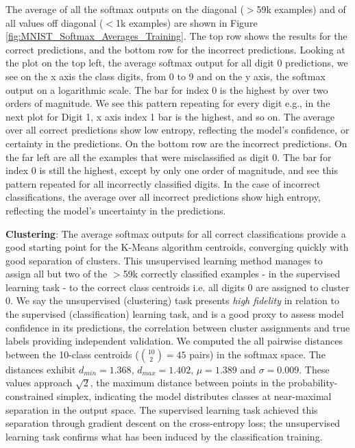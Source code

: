 The average of all the softmax outputs on the diagonal ($>$59k examples) and of all values off diagonal ($<$1k examples) are shown in Figure \ref{fig:MNIST_Softmax_Averages_Training}. The top row shows the results for the correct predictions, and the bottom row for the incorrect predictions. Looking at the plot on the top left, the average softmax output for all digit 0 predictions, we see on the x axis the class digits, from 0 to 9 and on the y axis, the softmax output on a logarithmic scale. The bar for index 0 is the highest by over two orders of magnitude. We see this pattern repeating for every digit e.g., in the next plot for Digit 1, x axis index 1 bar is the highest, and so on. The average over all correct predictions show low entropy, reflecting the model's confidence, or certainty in the predictions. On the bottom row are the incorrect predictions. On the far left are all the examples that were misclassified as digit 0. The bar for index 0 is still the highest, except by only one order of magnitude, and see this pattern repeated for all incorrectly classified digits. In the case of incorrect classifications, the average over all incorrect predictions show high entropy, reflecting the model's uncertainty in the predictions.

\noindent  \textbf{Clustering}: The average softmax outputs for all correct classifications provide a good starting point for the K-Means algorithm centroids, converging quickly with good separation of clusters. This unsupervised learning method manages to assign all but two of the $>$59k correctly classified examples - in the supervised learning task - to the correct class centroids i.e. all digits 0 are assigned to cluster 0. We say the unsupervised (clustering) task presents \emph{high fidelity} in relation to the supervised (classification) learning task, and is a good proxy to assess model confidence in its predictions, the correlation between cluster assignments and true labels providing independent validation. 
We computed the all pairwise distances between the 10-class centroids ($\binom{10}{2}=45$ pairs) in the softmax space. The distances exhibit $d_{min}=1.368$, $d_{max}=1.402$, $\mu=1.389$ and $\sigma=0.009$. These values approach $\sqrt{2}$, the maximum distance between points in the probability-constrained simplex, indicating the model distributes classes at near-maximal separation in the output space. The supervised learning task achieved this separation through gradient descent on the cross-entropy loss; the unsupervised learning task confirms what has been induced by the classification training.

